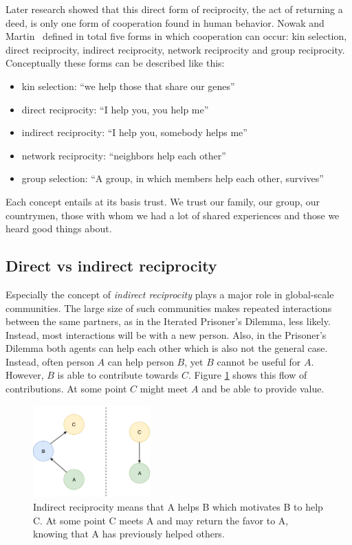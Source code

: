 Later research showed that this direct form of reciprocity, the act of returning a deed,
is only one form of cooperation found in human behavior. Nowak and 
Martin~\cite{nowak2006five} defined in total five forms in which cooperation can occur: kin selection, direct
reciprocity, indirect reciprocity, network reciprocity and group reciprocity. Conceptually these 
forms can be described like this:

\begin{itemize}
    \item kin selection: ``we help those that share our genes''
    \item direct reciprocity: ``I help you, you help me''
    \item indirect reciprocity: ``I help you, somebody helps me''
    \item network reciprocity: ``neighbors help each other''
    \item group selection: ``A group, in which members help each other, survives''
\end{itemize}

Each concept entails at its basis trust. We trust our family, our group, our countrymen, those with whom we had a lot
of shared experiences and those we heard good things about. 

\subsection{Direct vs indirect reciprocity}
\label{sec:indirect_reciprocity}
Especially the concept of \textit{indirect reciprocity} plays a major role in global-scale communities. The 
large size of such communities makes repeated interactions between the same partners, as in the Iterated Prisoner's
Dilemma, less likely. Instead, most interactions will be with a new person. Also, in the Prisoner's 
Dilemma both agents can help each other which is also not the general case. Instead, often person 
$A$ can help person $B$, yet $B$ cannot be useful for $A$. However, $B$ is able to contribute towards
$C$. Figure \ref{fig:indirect_reciprocity} shows this flow of contributions. At some point $C$ might
meet $A$ and be able to provide value.

\begin{figure}
    \centering
    \includegraphics[width=0.4\textwidth]{images/indirect_reciprocity.pdf}
    \caption{Indirect reciprocity means that A helps B which motivates B to help C. At some point
    C meets A and may return the favor to A, knowing that A has previously helped others.}
    \label{fig:indirect_reciprocity}
\end{figure}

